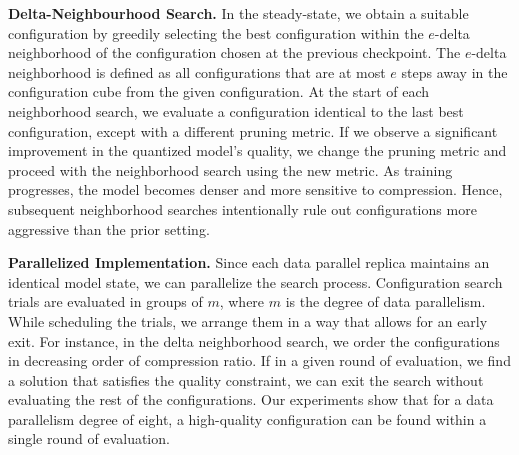 

\noindent\textbf{Delta-Neighbourhood Search.} In the steady-state, we obtain a suitable configuration by greedily selecting the best configuration within the $e$-delta neighborhood of the configuration chosen at the previous checkpoint. The $e$-delta neighborhood is defined as all configurations that are at most $e$ steps away in the configuration cube from the given configuration. At the start of each neighborhood search, we evaluate a configuration identical to the last best configuration, except with a different pruning metric. If we observe a significant improvement in the quantized model’s quality, we change the pruning metric and proceed with the neighborhood search using the new metric. As training progresses, the model becomes denser and more sensitive to compression. Hence, subsequent neighborhood searches intentionally rule out configurations more aggressive than the prior setting.




\noindent\textbf{Parallelized Implementation.} Since each data parallel replica maintains an identical model state, we can parallelize the search process. Configuration search trials are evaluated in groups of $m$, where $m$ is the degree of data parallelism. While scheduling the trials, we arrange them in a way that allows for an early exit. For instance, in the delta neighborhood search, we order the configurations in decreasing order of compression ratio. If in a given round of evaluation, we find a solution that satisfies the quality constraint, we can exit the search without evaluating the rest of the configurations. Our experiments show that for a data parallelism degree of eight, a high-quality configuration can be found within a single round of evaluation. %

